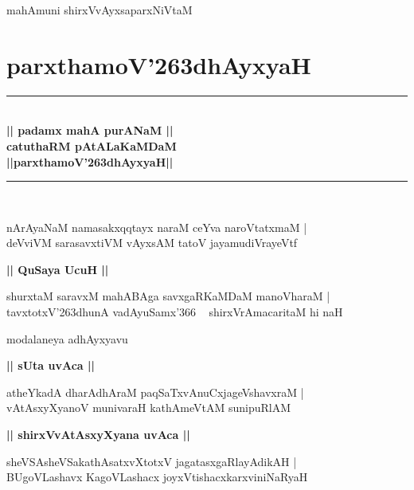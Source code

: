 \documentclass[twoside,12pt,openright]{book}
\def\S{\char'263}
\newcounter{shloka}[chapter]
\def\uvaca#1{\centerline{{\large\textbf{#1}}}}
\begin{document}

\frontmatter

\tableofcontents

\mainmatter
\begin{center}
mahAmuni shirxVvAyxsaparxNiVtaM
\end{center}
\chapter{parxthamoV\S dhAyxyaH}
\begin{center}
\rule{2cm}{1pt}\\[.5cm]
{\huge\bfseries || padamx mahA purANaM ||}\\[.3cm]
{\Large\bfseries  catuthaRM pAtALaKaMDaM }\\[.3cm]
{\LARGE\bfseries ||parxthamoV\S dhAyxyaH||}\\[.3cm]
\rule{2cm}{1pt}\\
\end{center}

\begin{shloka}%
nArAyaNaM namasakxqqtayx naraM ceYva naroVtatxmaM |\\
deVviVM sarasavxtiVM vAyxsAM tatoV jayamudiVrayeVtf
\end{shloka}

\uvaca{|| QuSaya UcuH ||}

\begin{shloka}%
shurxtaM saravxM mahABAga savxgaRKaMDaM manoVharaM |\\
tavxtotxV\S dhunA vadAyuSamx\char'366 ~ shirxVrAmacaritaM hi naH
\end{shloka}

\begin{center}
modalaneya adhAyxyavu
\end{center}

\uvaca{|| sUta uvAca ||}

\begin{shloka}%
atheYkadA dharAdhAraM paqSaTxvAnuCxjageVshavxraM |\\
vAtAsxyXyanoV munivaraH kathAmeVtAM sunipuRlAM
\end{shloka}

\uvaca{|| shirxVvAtAsxyXyana uvAca ||}

\begin{shloka}%
sheVSAsheVSakathAsatxvXtotxV jagatasxgaRlayAdikAH |\\
BUgoVLashavx KagoVLashacx joyxVtishacxkarxviniNaRyaH
\end{shloka}
\end{document}
